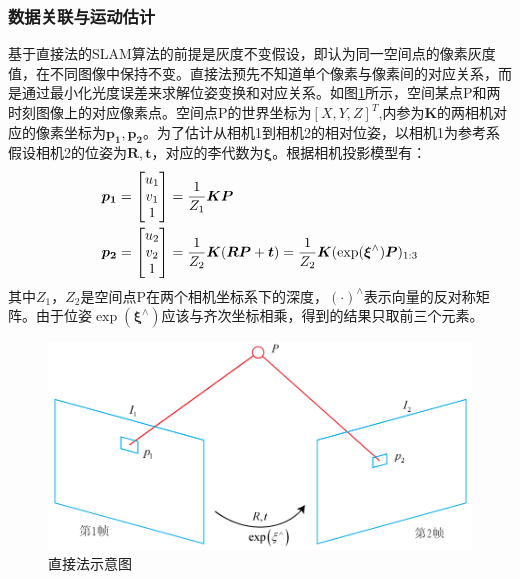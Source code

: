 \subsubsection*{数据关联与运动估计}
基于直接法的SLAM算法的前提是灰度不变假设，即认为同一空间点的像素灰度值，在不同图像中保持不变。直接法预先不知道单个像素与像素间的对应关系，而是通过最小化光度误差来求解位姿变换和对应关系。如图\ref{fig3.5}所示，空间某点P和两时刻图像上的对应像素点。空间点P的世界坐标为$[X,Y,Z]^T$,内参为$\boldsymbol{K}$的两相机对应的像素坐标为$\boldsymbol{p_1},\boldsymbol{p_2}$。为了估计从相机1到相机2的相对位姿，以相机1为参考系假设相机2的位姿为$\boldsymbol{R},\boldsymbol{t}$，对应的李代数为$\boldsymbol{\xi}$。根据相机投影模型有：
\begin{equation}
\label{equ3.8}
\begin{aligned}
& \boldsymbol{p_1} = 
\begin{bmatrix}
u_1 \cr v_1 \cr 1 \cr 
\end{bmatrix}
={1 \over Z_1} \boldsymbol{K} \boldsymbol{P}
\\
& \boldsymbol{p_2} = 
\begin{bmatrix}
u_2 \cr v_2 \cr 1 \cr
\end{bmatrix}
={1 \over Z_2} \boldsymbol{K} ( \boldsymbol{R} \boldsymbol{P}+\boldsymbol{t}) = {1 \over Z_2} \boldsymbol{K} ( \exp (\boldsymbol{\xi}^{\wedge}) \boldsymbol{P})_{1:3}
\end{aligned}
\end{equation}
其中$Z_1$，$Z_2$是空间点P在两个相机坐标系下的深度，$(\cdot)^{\wedge}$表示向量的反对称矩阵。由于位姿$\exp(\boldsymbol{\xi}^{\wedge})$应该与齐次坐标相乘，得到的结果只取前三个元素。
\begin{figure}
\centering
\includegraphics[scale=0.5]{figures/Fig3.5.png}
\caption{直接法示意图}
\label{fig3.5}
\end{figure}

